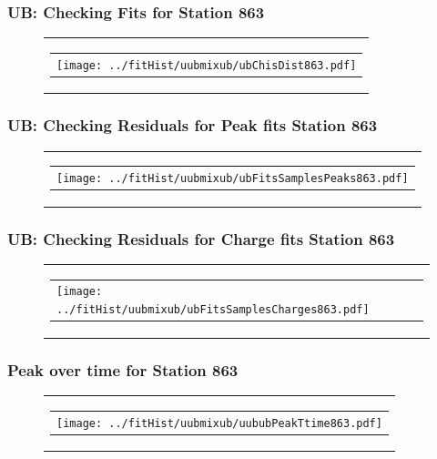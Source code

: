 \documentclass[aspectratio=169]{beamer}
\begin{document}
\begin{frame}
  \frametitle{UB: Checking Fits for Station 863}
  \begin{figure}
    \centering
    \begin{tabularx}{\textwidth}{C}
      \begin{tabular}{l}
        \texttt{[image: ../fitHist/uubmixub/ubChisDist863.pdf]}
      \end{tabular}
    \end{tabularx}
  \end{figure}
\end{frame}

\begin{frame}
  \frametitle{UB: Checking Residuals for Peak fits Station 863}
  \begin{figure}
    \centering
    \begin{tabularx}{\textwidth}{C}
      \begin{tabular}{l}
        \texttt{[image: ../fitHist/uubmixub/ubFitsSamplesPeaks863.pdf]}
      \end{tabular}
    \end{tabularx}
  \end{figure}
\end{frame}

\begin{frame}
  \frametitle{UB: Checking Residuals for Charge fits Station 863}
  \begin{figure}
    \centering
    \begin{tabularx}{\textwidth}{C}
      \begin{tabular}{l}
        \texttt{[image: ../fitHist/uubmixub/ubFitsSamplesCharges863.pdf]}
      \end{tabular}
    \end{tabularx}
  \end{figure}
\end{frame}


\begin{frame}
  \frametitle{Peak over time for Station 863}
  \begin{figure}
    \centering
    \begin{tabularx}{\textwidth}{C}
      \begin{tabular}{l}
        \texttt{[image: ../fitHist/uubmixub/uububPeakTtime863.pdf]}
      \end{tabular}
    \end{tabularx}
  \end{figure}
\end{frame}
\end{document}
